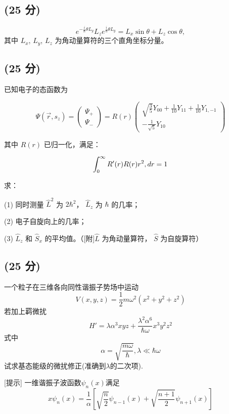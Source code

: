 \subsection{(25 分)}
\[    e^{-\frac{i}{\hbar}\theta L_y} L_z e^{\frac{i}{\hbar}\theta L_y} = L_x \sin\theta + L_z \cos\theta, ~\]
    其中 $L_x$, $L_y$, $L_z$ 为角动量算符的三个直角坐标分量。
\subsection{(25 分)}

已知电子的态函数为

\[
\Psi(\vec{r}, s_z) = \begin{pmatrix} \Psi_+ \\ \Psi_- \end{pmatrix} = R(r) \begin{pmatrix} \sqrt{\frac{3}{5}} Y_{00} + \frac{1}{10} Y_{11} + \frac{1}{10} Y_{1,-1} \\ -\frac{1}{\sqrt{5}} Y_{10} \end{pmatrix}~
\]

其中 \( R(r) \) 已归一化，满足：

\[
\int_0^\infty R'(r) R(r) r^2 \\, dr = 1~
\]

求：

(1) 同时测量 \( \hat{L}^2 \) 为 \( 2\hbar^2 \)， \( \hat{L}_z \) 为 \( \hbar \)  的几率；  

(2) 电子自旋向上的几率；  

(3) \( \hat{L}_z \) 和 \( \hat{S}_x \) 的平均值。（[附]\( \hat{L} \) 为角动量算符， \( \hat{S} \) 为自旋算符）
\subsection{(25 分)}
一个粒子在三维各向同性谐振子势场中运动
$$V(x,y,z)=\frac{1}{2}m\omega^2(x^2+y^2+z^2)~$$
若加上羁微扰$$H'=\lambda \alpha^3xyz+\frac{\lambda^2\alpha{^6}}{\hbar \omega}x^3y^2z^2~$$
式中$$\alpha=\sqrt{\frac{m \omega}{\hbar}},\lambda \ll \hbar \omega~$$
试求基态能级的微扰修正(准确到$\lambda$的二次项).

[提示] 一维谐振子波函数$\psi_n(x)$满足
$$x \psi_n (x) = \frac{1}{\alpha} \left[ \sqrt{\frac{n}{2}} \psi_{n-1}(x) + \sqrt{\frac{n+1}{2}} \psi_{n+1}(x) \right]~$$
